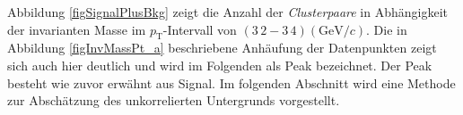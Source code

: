 \newline
Abbildung \ref{figSignalPlusBkg} zeigt die Anzahl der \textit{Clusterpaare} in Abhängigkeit der invarianten Masse im $p_{\text{T}}$-Intervall von $(3\,2 - 3\,4)(\text{GeV}/c)$.
Die in Abbildung \ref{figInvMassPt_a} beschriebene Anhäufung der Datenpunkten zeigt sich auch hier deutlich und wird im Folgenden als Peak bezeichnet.
Der Peak besteht wie zuvor erwähnt aus Signal.
\newline
Im folgenden Abschnitt wird eine Methode zur Abschätzung des unkorrelierten Untergrunds vor\-ge\-stellt. 